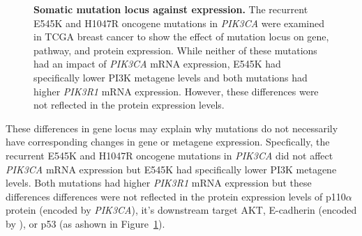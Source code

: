 \begin{figure}[!ht]
\begin{mdframed}
\begin{center}
    \end{center}
    \caption[Somatic mutation locus against expression]{\small \textbf{Somatic mutation locus against expression.} The recurrent E545K and H1047R oncogene mutations in \textit{PIK3CA} were examined in TCGA breast cancer to show the effect of mutation locus on gene, pathway, and protein expression. While neither of these mutations had an impact of \textit{PIK3CA} mRNA expression, E545K had specifically lower PI3K \citep{Gatza2011} metagene levels and both mutations had higher \textit{PIK3R1} mRNA expression. However, these differences were not reflected in the protein expression levels.
}
\label{fig:mutation_expr}
\end{mdframed}
\end{figure}

These differences in gene locus may explain why mutations do not necessarily have corresponding changes in gene or metagene expression. Specfically, the recurrent E545K and H1047R oncogene mutations in \textit{PIK3CA} did not affect \textit{PIK3CA} mRNA expression but E545K had specifically lower PI3K \citep{Gatza2011} metagene levels. Both mutations had higher \textit{PIK3R1} mRNA expression but these differences differences were not reflected in the protein expression levels of p110$\alpha$ protein (encoded by \textit{PIK3CA}), it's downstream target AKT, E-cadherin (encoded by ), or p53 (as ashown in Figure~\ref{fig:mutation_expr}).

